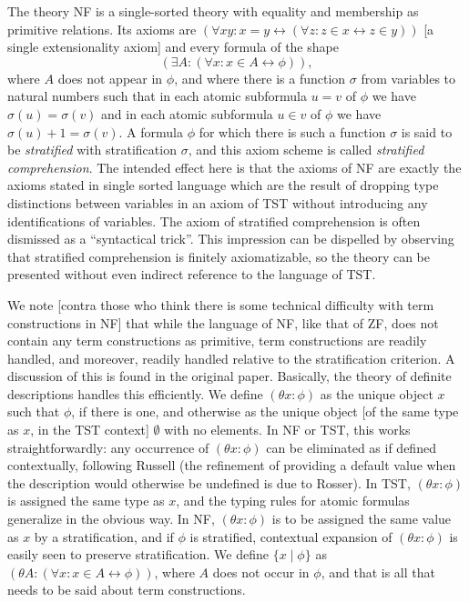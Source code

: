 \documentclass[12pt]{article}
\begin{document}
The theory NF is a single-sorted theory with equality and membership as primitive relations.   Its axioms are $(\forall xy:x=y \leftrightarrow (\forall z:z \in x \leftrightarrow z \in y))$ [a single extensionality axiom]
and every formula of the shape $$(\exists A:(\forall x:x \in A \leftrightarrow \phi)),$$ where $A$ does not appear in $\phi$, and where there is a function $\sigma$ from variables to natural numbers such that
in each atomic subformula $u=v$ of $\phi$ we have $\sigma(u)=\sigma(v)$ and in each atomic subformula $u \in v$ of $\phi$ we have $\sigma(u)+1=\sigma(v)$.  A formula $\phi$ for which there is such a function $\sigma$ is said to be {\em stratified\/} with stratification $\sigma$, and this axiom scheme is called {\em stratified comprehension\/}.  The intended effect here is that the axioms of NF are exactly the axioms stated in single sorted
language which are the result of dropping type distinctions between variables in an axiom of TST without introducing any identifications of variables.   The axiom of stratified comprehension is often dismissed as
a ``syntactical trick''.  This impression can be dispelled by observing that stratified comprehension is finitely axiomatizable, so the theory can be presented without even indirect reference to the language of TST.

We note [contra those who think there is some technical difficulty with term constructions in NF] that while the language of NF, like that of ZF, does not contain any term constructions as primitive, term constructions are readily handled, and moreover, readily handled relative to the stratification criterion.  A discussion of this is found in the original paper.  Basically, the theory of definite descriptions handles this efficiently.
We define $(\theta x:\phi)$ as the unique object $x$ such that $\phi$, if there is one, and otherwise as the unique object [of the same type as $x$, in the TST context] $\emptyset$ with no elements.  In NF or TST, this works straightforwardly:  any occurrence
of $(\theta x:\phi)$ can be eliminated as if defined contextually, following Russell (the refinement of providing a default value when the description would otherwise be undefined is due to Rosser).  In TST, $(\theta x:\phi)$ is assigned the same type as $x$, and the typing rules for atomic formulas generalize in the obvious way.
In NF, $(\theta x:\phi)$ is to be assigned the same value as $x$ by a stratification, and if $\phi$ is stratified, contextual expansion of $(\theta x:\phi)$ is easily seen to preserve stratification.  We define $\{x\mid \phi\}$
as $(\theta A:(\forall x:x \in A \leftrightarrow \phi))$, where $A$ does not occur in $\phi$, and that is all that needs to be said about term constructions.
\end{document}
